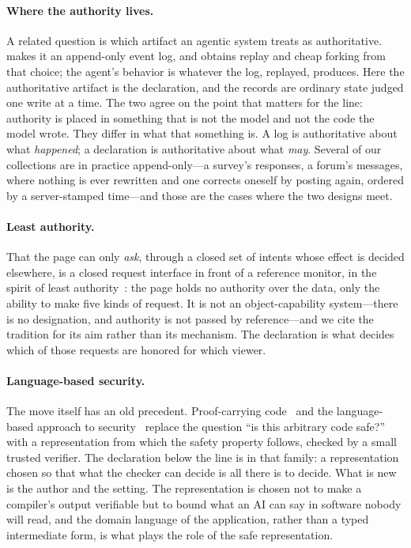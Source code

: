 \documentclass[11pt]{article}
\begin{document}
\paragraph{Where the authority lives.} A related question is which artifact an agentic system treats as authoritative. \citet{ynakajima2026log} makes it an append-only event log, and obtains replay and cheap forking from that choice; the agent's behavior is whatever the log, replayed, produces. Here the authoritative artifact is the declaration, and the records are ordinary state judged one write at a time. The two agree on the point that matters for the line: authority is placed in something that is not the model and not the code the model wrote. They differ in what that something is. A log is authoritative about what \emph{happened}; a declaration is authoritative about what \emph{may}. Several of our collections are in practice append-only---a survey's responses, a forum's messages, where nothing is ever rewritten and one corrects oneself by posting again, ordered by a server-stamped time---and those are the cases where the two designs meet.

\paragraph{Least authority.} That the page can only \emph{ask}, through a closed set of intents whose effect is decided elsewhere, is a closed request interface in front of a reference monitor, in the spirit of least authority~\cite{miller2006robust}: the page holds no authority over the data, only the ability to make five kinds of request. It is not an object-capability system---there is no designation, and authority is not passed by reference---and we cite the tradition for its aim rather than its mechanism. The declaration is what decides which of those requests are honored for which viewer.

\paragraph{Language-based security.} The move itself has an old precedent. Proof-carrying code~\cite{necula1997pcc} and the language-based approach to security~\cite{schneider2001lbs} replace the question ``is this arbitrary code safe?'' with a representation from which the safety property follows, checked by a small trusted verifier. The declaration below the line is in that family: a representation chosen so that what the checker can decide is all there is to decide. What is new is the author and the setting. The representation is chosen not to make a compiler's output verifiable but to bound what an AI can say in software nobody will read, and the domain language of the application, rather than a typed intermediate form, is what plays the role of the safe representation.
\end{document}
